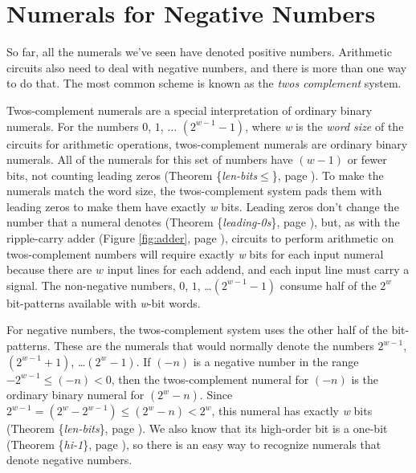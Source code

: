 \section{Numerals for Negative Numbers}
\label{sec:negative-numerals}

So far, all the numerals we've seen have denoted positive numbers.
Arithmetic circuits also need to deal with negative numbers,
and there is more than one way to do that.
The most common scheme is known as the \emph{twos complement} system.

Twos-complement
numerals are a special interpretation of
ordinary binary numerals.
For the numbers $0$, $1$, $\dots$ $(2^{w-1}-1)$,
where \emph{w} is the \emph{word size}
of the circuits for arithmetic operations,
twos-complement numerals are ordinary binary numerals.
All of the numerals for this set of numbers
have $(w-1)$ or fewer bits,
not counting leading zeros
(Theorem \{\emph{len-bits}$\le$\}, page \pageref{len-bitsLE}).
To make the numerals match the word size,
the twos-complement system pads them with leading zeros
to make them have exactly \emph{w} bits.
Leading zeros don't change the number that a numeral denotes
(Theorem \{\emph{leading-0s}\}, page \pageref{leading-0s}), but,
as with the ripple-carry adder (Figure \ref{fig:adder}, page \pageref{fig:adder}),
circuits to perform arithmetic on twos-complement numbers will
require exactly \emph{w} bits for each input numeral
because there are $w$ input lines for each addend,
and each input line must carry a signal.
The non-negative numbers, $0$, $1$, \dots $(2^{w-1}-1)$
consume half of the $2^w$ bit-patterns available with
\emph{w}-bit words.

For negative numbers,
the twos-complement system uses the other half of the bit-patterns.
These are the numerals that would normally denote the numbers
$2^{w-1}$, $(2^{w-1}+1)$, \dots $(2^{w}-1)$.
If $(-n)$ is a negative number in the range $-2^{w-1} \leq (-n) < 0$,
\label{2s-def}
then the twos-complement numeral for $(-n)$
is the ordinary binary numeral for $(2^w - n)$.
Since $2^{w-1} = (2^{w}-2^{w-1}) \leq (2^w - n) < 2^w$,
this numeral has exactly \emph{w} bits
(Theorem \{\emph{len-bits}\}, page \pageref{len-bits}).
We also know that its high-order bit is a one-bit
(Theorem \{\emph{hi-1}\}, page \pageref{hi-1}),
so there is an easy way to recognize numerals that denote negative numbers.

